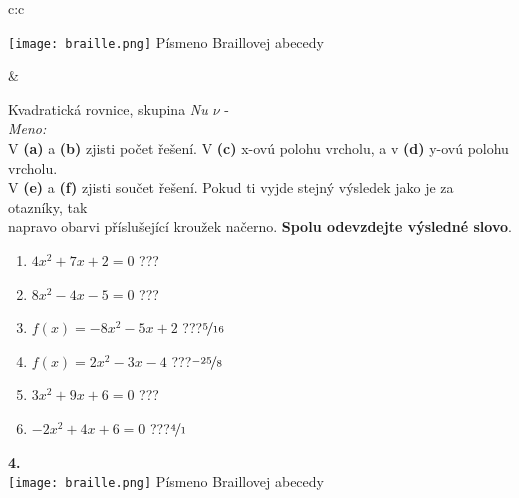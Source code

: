 \documentclass[10pt]{report}
\begin{document}
\begin{tabular}{c:c}
\begin{minipage}[c][99mm][t]{0.49\linewidth}
\begin{center}
\begin{minipage}{0.20\linewidth}
\begin{center}
\texttt{[image: braille.png]}
{\small Písmeno Braillovej abecedy}
\end{center}
\end{minipage}
\end{center}
\end{minipage}
&
\begin{minipage}[c][99mm][t]{0.49\linewidth}
\begin{center}
\vspace{7mm}
{\huge Kvadratická rovnice, skupina \textit{Nu $\nu$} -}\\[4.5mm]
\textit{Meno:}\phantom{xxxxxxxxxxxxxxxxxxxxxxxxxxxxxxxxxxxxxxxxxxxxxxxxxxxxxxxxxxxxxxxxx}\\[3.5mm]
V \textbf{(a)} a \textbf{(b)} zjisti počet řešení. V \textbf{(c)} x-ovú polohu vrcholu, a v \textbf{(d)} y-ovú polohu vrcholu.\\V \textbf{(e)} a \textbf{(f)} zjisti součet řešení. Pokud ti vyjde stejný výsledek jako je za otazníky, tak\\napravo obarvi příslušející kroužek načerno. \textbf{Spolu odevzdejte výsledné slovo}.\\[3mm]
\begin{minipage}{0.77\linewidth}
\begin{center}
\begin{varwidth}{\textwidth}
\begin{enumerate}
\large
\item $4x^2+7x+2=0$\quad \dotfill\; ???\;\dotfill {}
\item $8x^2-4x-5=0$\quad \dotfill\; ???\;\dotfill {}
\item $f(x)=-8x^2-5x+2$\quad \dotfill\; ???\;\dotfill \quad $\nicefrac{5}{16}$
\item $f(x)=2x^2-3x-4$\quad \dotfill\; ???\;\dotfill \quad $\nicefrac{-25}{8}$
\item $3x^2+9x+6=0$\quad \dotfill\; ???\;\dotfill {}
\item $-2x^2+4x+6=0$\quad \dotfill\; ???\;\dotfill \quad $\nicefrac{4}{1}$
\end{enumerate}
\end{varwidth}
\end{center}
\end{minipage}
\begin{minipage}{0.20\linewidth}
\begin{center}
{\Huge\bfseries 4.} \\[2mm]
\texttt{[image: braille.png]}
{\small Písmeno Braillovej abecedy}
\end{center}
\end{minipage}
\end{center}
\end{minipage}

\end{tabular}
\end{document}
